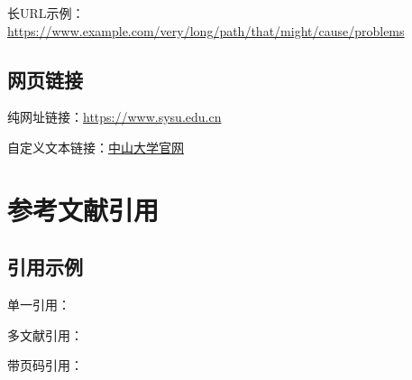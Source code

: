 \documentclass[12pt]{ctexart}
\begin{document}
\begin{sloppypar}
长URL示例：\url{https://www.example.com/very/long/path/that/might/cause/problems}

\subsection{网页链接}
纯网址链接：\url{https://www.sysu.edu.cn}

自定义文本链接：\href{https://www.sysu.edu.cn}{中山大学官网}

\section{参考文献引用}
\subsection{引用示例}
单一引用：\cite{knuth1986texbook}

多文献引用：\cite{vaswani2017attention,brown2020language}

带页码引用：\cite[pp. 45-47]{wang2010zhongwen}


\newpage



\end{sloppypar}
\end{document}

